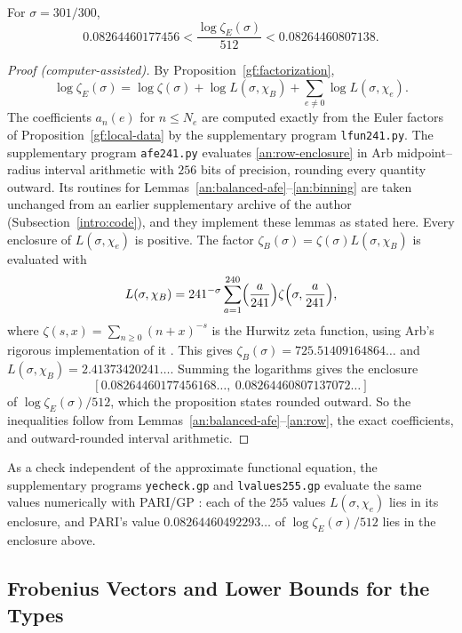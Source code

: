 \begin{proposition}\label{an:genus-value}
For $\sigma=301/300$,
\[
 0.08264460177456<\frac{\log\zeta_E(\sigma)}{512}<0.08264460807138.
\]
\end{proposition}

\begin{proof}[Proof (computer-assisted)]
By Proposition~\ref{gf:factorization},
\[
 \log\zeta_E(\sigma)=\log\zeta(\sigma)+\log L(\sigma,\chi_B)
 +\sum_{e\ne0}\log L(\sigma,\chi_e).
\]
The coefficients $a_n(e)$ for $n\le N_e$ are computed exactly from the Euler
factors of Proposition~\ref{gf:local-data} by the supplementary program
\texttt{lfun241.py}. The supplementary program \texttt{afe241.py} evaluates
\eqref{an:row-enclosure} in Arb midpoint--radius interval arithmetic
\cite{Johansson2017,FLINT} with $256$ bits of precision, rounding every
quantity outward. Its routines for
Lemmas~\ref{an:balanced-afe}--\ref{an:binning} are taken unchanged from an
earlier supplementary archive of the author (Subsection~\ref{intro:code}), and
they implement these lemmas as stated here. Every enclosure of
$L(\sigma,\chi_e)$ is positive. The factor
$\zeta_B(\sigma)=\zeta(\sigma)L(\sigma,\chi_B)$ is evaluated with
\[
 L(\sigma,\chi_B)=241^{-\sigma}\sum_{a=1}^{240}\Bigl(\frac
 a{241}\Bigr)\zeta\Bigl(\sigma,\frac a{241}\Bigr),
\]
where $\zeta(s,x)=\sum_{n\ge0}(n+x)^{-s}$ is the Hurwitz zeta function,
using Arb's rigorous implementation of it \cite{Johansson2015Hurwitz}. This
gives $\zeta_B(\sigma)=725.51409164864\ldots$ and
$L(\sigma,\chi_B)=2.41373420241\ldots$. Summing the logarithms gives the
enclosure
\[
 [0.08264460177456168\ldots,\ 0.08264460807137072\ldots]
\]
of $\log\zeta_E(\sigma)/512$, which the proposition states rounded outward.
So the inequalities follow from
Lemmas~\ref{an:balanced-afe}--\ref{an:row}, the exact coefficients, and
outward-rounded interval arithmetic.
\end{proof}

As a check
independent of the approximate functional equation, the supplementary
programs \texttt{yecheck.gp} and \texttt{lvalues255.gp} evaluate the same
values numerically with PARI/GP \cite{PARI}: each of the $255$ values
$L(\sigma,\chi_e)$ lies in its enclosure, and PARI's value
$0.08264460492293\ldots$ of $\log\zeta_E(\sigma)/512$ lies in the enclosure
above.

\subsection{Frobenius Vectors and Lower Bounds for the Types}
\label{an:census}

